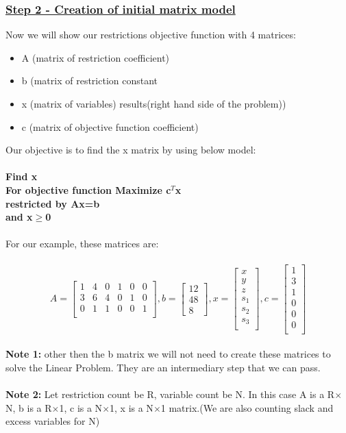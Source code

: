 \subsubsection{\underline{Step 2 - Creation of initial matrix model}}
Now we will show our restrictions objective function with 4 matrices:\\
\begin{itemize}
	\item A \quad (matrix of restriction coefficient)
	\item b \quad (matrix of restriction constant
	\item x \quad (matrix of variables)
	 results(right hand side of the problem))
	\item c \quad (matrix of objective function coefficient)
\end{itemize}
Our objective is to find the x matrix by using below model:\\
\\	
\textbf{Find x}\\
\textbf{For objective function \quad Maximize c$^T$x}\\
\textbf{restricted by Ax=b}\\
\textbf{and x$\geq$0}\\
\\
For our example, these matrices are:\\
\\
\[A=
\begin{bmatrix}
	1 & 4 & 0 & 1 & 0 & 0 \\
	3 & 6 & 4 & 0 & 1 & 0 \\
	0 & 1 & 1 & 0 & 0 & 1 \\
\end{bmatrix}
,b=
\begin{bmatrix}
12\\
48\\
8
\end{bmatrix}
,x=
\begin{bmatrix}
x\\
y\\
z\\
s_1\\
s_2\\
s_3\\
\end{bmatrix}
,c=
\begin{bmatrix}
1\\
3\\
1\\
0\\
0\\
0\\
\end{bmatrix}
\]
\\
\textbf{Note 1:} other then the b matrix we will not need to create these matrices to solve the Linear Problem. They are an intermediary step that we can pass.\\
\\
\textbf{Note 2:} Let restriction count be R, variable count be N. In this case A is a R$\times$N, b is a R$\times$1, c is a N$\times$1, x is a N$\times$1 matrix.(We are also counting slack and excess variables for N)\\
\\
